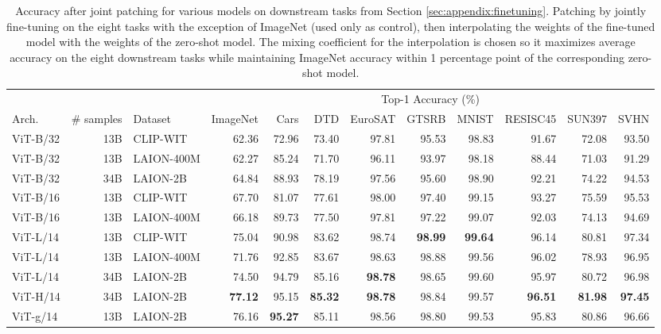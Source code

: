 \begin{appendix}
\begin{table}
\begin{tabular}{lrlrrrrrrrrr}
& & & \multicolumn{9}{c}{Top-1 Accuracy (\%)} \\
Arch. & \# samples &  Dataset & ImageNet & Cars & DTD & EuroSAT & GTSRB & MNIST & RESISC45 & SUN397 & SVHN \\                                                    
\midrule                                                                                 ViT-B/32 &          13B &    CLIP-WIT &         62.36 &     72.96 &    73.40 &        97.81 &      95.53 &      98.83 &         91.67 &       72.08 &     93.50 \\
ViT-B/32 &          13B &  LAION-400M &         62.27 &     85.24 &    71.70 &        96.11 &      93.97 &      98.18 &         88.44 &       71.03 &     91.29 \\
ViT-B/32 &          34B &    LAION-2B &         64.84 &     88.93 &    78.19 &        97.56 &      95.60 &      98.90 &         92.21 &       74.22 &     94.53 \\
ViT-B/16 &          13B &    CLIP-WIT &         67.70 &     81.07 &    77.61 &        98.00 &      97.40 &      99.15 &         93.27 &       75.59 &     95.53 \\
ViT-B/16 &          13B &  LAION-400M &         66.18 &     89.73 &    77.50 &        97.81 &      97.22 &      99.07 &         92.03 &       74.13 &     94.69 \\
ViT-L/14 &          13B &    CLIP-WIT &         75.04 &     90.98 &    83.62 &        98.74 &      \textbf{98.99} &      \textbf{99.64} &         96.14 &       80.81 &     97.34 \\
ViT-L/14 &          13B &  LAION-400M &         71.76 &     92.85 &    83.67 &        98.63 &      98.88 &      99.56 &         96.02 &       78.93 &     96.95 \\
ViT-L/14 &          34B &    LAION-2B &         74.50 &     94.79 &    85.16 &        \textbf{98.78} &      98.65 &      99.60 &         95.97 &       80.72 &     96.98 \\
ViT-H/14 &          34B &    LAION-2B &         \textbf{77.12} &     95.15 &    \textbf{85.32} &        \textbf{98.78} &      98.84 &      99.57 &         \textbf{96.51} &       \textbf{81.98} &     \textbf{97.45} \\
ViT-g/14 &          13B &    LAION-2B &         76.16 &     \textbf{95.27} &    85.11 &        98.56 &      98.80 &      99.53 &         95.83 &       80.86 &     96.66 \\        
\bottomrule
\end{tabular}
\caption{
    Accuracy after joint patching \cite{ilharco2022patching} for various models on downstream tasks from Section \ref{sec:appendix:finetuning}. Patching by jointly fine-tuning on the eight tasks with the exception of ImageNet (used only as control), then interpolating the weights of the fine-tuned model with the weights of the zero-shot model. The mixing coefficient for the interpolation is chosen so it maximizes average accuracy on the eight downstream tasks while maintaining ImageNet accuracy within 1 percentage point of the corresponding zero-shot model.
    \label{tab:appendix:joint_ft_patch}
    }
\end{table}



\end{appendix}
